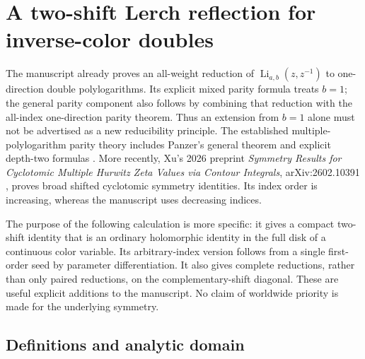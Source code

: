 \documentclass[11pt,letterpaper]{article}
\numberwithin{equation}{section}
\theoremstyle{plain}
\theoremstyle{definition}
\theoremstyle{remark}
\begin{document}

\section{A two-shift Lerch reflection for inverse-color doubles}
\label{gap:sec:main}\label{sec:gap}

The manuscript already proves an all-weight reduction of
$\operatorname{Li}_{a,b}(z,z^{-1})$ to one-direction double
polylogarithms. Its explicit mixed parity formula treats $b=1$; the
general parity component also follows by combining that reduction with
the all-index one-direction parity theorem. Thus an extension from
$b=1$ alone must not be advertised as a new reducibility principle.
The established multiple-polylogarithm parity theory includes Panzer's
general theorem and explicit depth-two formulas \cite{panzer}. More recently, Xu's
2026 preprint \emph{Symmetry Results for Cyclotomic Multiple Hurwitz
Zeta Values via Contour Integrals}, arXiv:2602.10391 \cite{xu}, proves broad
shifted cyclotomic symmetry identities. Its index order is increasing,
whereas the manuscript uses decreasing indices.

The purpose of the following calculation is more specific: it gives a
compact two-shift identity that is an ordinary holomorphic identity in
the full disk of a continuous color variable. Its arbitrary-index
version follows from a single first-order seed by parameter
differentiation. It also gives complete reductions, rather than only
paired reductions, on the complementary-shift diagonal. These are
useful explicit additions to the manuscript. No claim of worldwide
priority is made for the underlying symmetry.

\subsection{Definitions and analytic domain}
\end{document}
